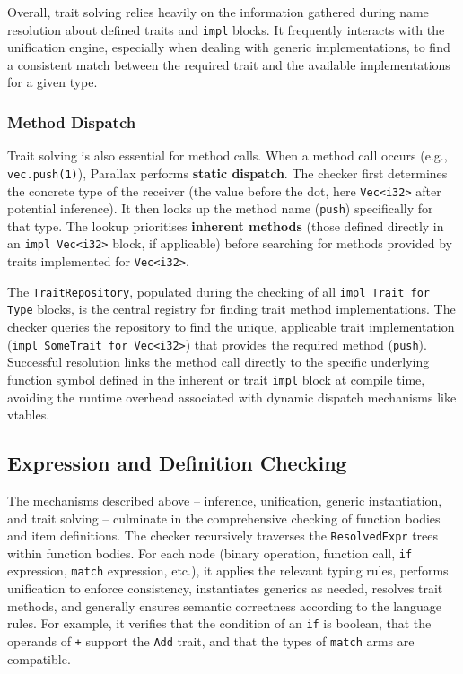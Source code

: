 Overall, trait solving relies heavily on the information gathered during name resolution about defined traits and \texttt{impl} blocks. It frequently interacts with the unification engine, especially when dealing with generic implementations, to find a consistent match between the required trait and the available implementations for a given type.

\subsubsection{Method Dispatch}

Trait solving is also essential for method calls. When a method call occurs (e.g., \texttt{vec.push(1)}), Parallax performs \textbf{static dispatch}. The checker first determines the concrete type of the receiver (the value before the dot, here \texttt{Vec<i32>} after potential inference). It then looks up the method name (\texttt{push}) specifically for that type. The lookup prioritises \textbf{inherent methods} (those defined directly in an \texttt{impl Vec<i32>} block, if applicable) before searching for methods provided by traits implemented for \texttt{Vec<i32>}.

The \texttt{TraitRepository}, populated during the checking of all \texttt{impl Trait for Type} blocks, is the central registry for finding trait method implementations. The checker queries the repository to find the unique, applicable trait implementation (\texttt{impl SomeTrait for Vec<i32>}) that provides the required method (\texttt{push}). Successful resolution links the method call directly to the specific underlying function symbol defined in the inherent or trait \texttt{impl} block at compile time, avoiding the runtime overhead associated with dynamic dispatch mechanisms like vtables.

\subsection{Expression and Definition Checking}

The mechanisms described above -- inference, unification, generic instantiation, and trait solving -- culminate in the comprehensive checking of function bodies and item definitions. The checker recursively traverses the \texttt{ResolvedExpr} trees within function bodies. For each node (binary operation, function call, \texttt{if} expression, \texttt{match} expression, etc.), it applies the relevant typing rules, performs unification to enforce consistency, instantiates generics as needed, resolves trait methods, and generally ensures semantic correctness according to the language rules. For example, it verifies that the condition of an \texttt{if} is boolean, that the operands of \texttt{+} support the \texttt{Add} trait, and that the types of \texttt{match} arms are compatible.

